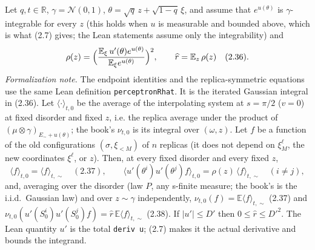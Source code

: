 \begin{lemma}[Lemma 2.3.1: the endpoint $v=0$]\label{lem:sg-tal:perceptron-cavity-endpoint}
  \leanok
Let $q,t\in\mathbb R$, $\gamma=\mathcal N(0,1)$, $\theta=\sqrt q\,z+\sqrt{1-q}\,\xi$, and assume that $e^{u(\theta)}$ is $\gamma$-integrable for every $z$ (this holds when $u$ is measurable and bounded above, which is what (2.7) gives; the Lean statements assume only the integrability) and
\[
 \rho(z)=\Bigl(\frac{\mathbb E_\xi\,u'(\theta)e^{u(\theta)}}{\mathbb E_\xi e^{u(\theta)}}\Bigr)^2,\qquad
 \widehat r=\mathbb E_z\,\rho(z)\quad(2.36).
\]
\emph{Formalization note.} The endpoint identities and the replica-symmetric equations use the
same Lean definition \texttt{perceptronRhat}. It is the iterated Gaussian integral in (2.36).
Let $\langle\cdot\rangle_{t,0}$ be the average of the interpolating system at $s=\pi/2$ ($v=0$) at fixed disorder and fixed $z$, i.e. the replica average
under the product of $(\mu\otimes\gamma)_{E_\sim+u(\theta)}$; the book's $\nu_{t,0}$ is its integral over $(\omega,z)$. Let $f$ be a function of the old configurations $(\sigma,\xi_{<M})$ of $n$ replicas (it does not depend on
$\xi_M^\ell$, the new coordinates $\xi^\ell$, or $z$). Then, at every fixed disorder and every fixed $z$,
\[
 \langle f\rangle_{t,0}=\langle f\rangle_{t,\sim}\quad(2.37),\qquad
 \langle u'(\theta^i)u'(\theta^j)f\rangle_{t,0}=\rho(z)\,\langle f\rangle_{t,\sim}\quad(i\neq j),
\]
and, averaging over the disorder (law $P$, any s-finite measure; the book's is the i.i.d.\ Gaussian law) and over $z\sim\gamma$ independently,
$\nu_{t,0}(f)=\mathbb E\langle f\rangle_{t,\sim}$ (2.37) and $\nu_{t,0}(u'(S_0^i)u'(S_0^j)f)=\widehat r\,\mathbb E\langle f\rangle_{t,\sim}$ (2.38). If $|u'|\le D'$ then
$0\le\widehat r\le D'^2$. The Lean quantity $u'$ is the total \texttt{deriv u}; (2.7) makes it the actual derivative and bounds the integrand.
\end{lemma}
